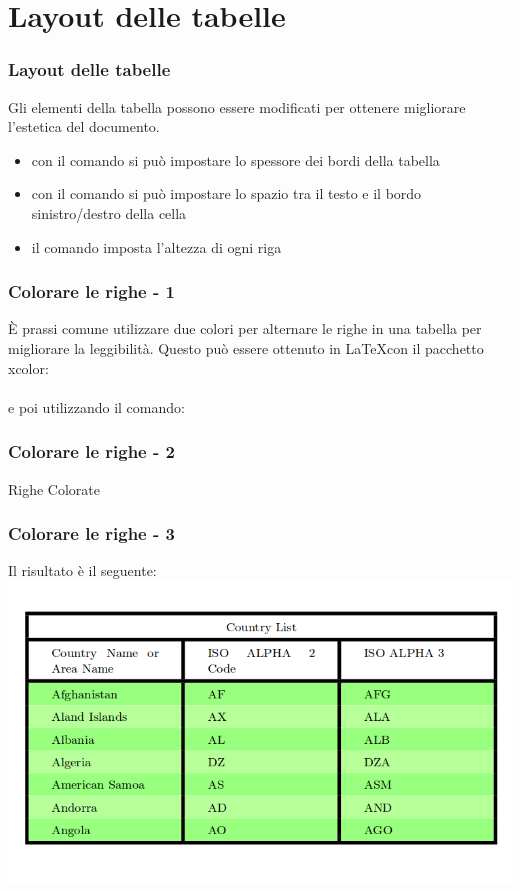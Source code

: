 \section{Layout delle tabelle}
\begin{frame}[fragile]
 \frametitle{Layout delle tabelle}

 Gli elementi della tabella possono essere modificati per ottenere migliorare l'estetica del documento.
 \begin{itemize}
     \item con il comando \inline{\setlength{\arrayrulewidth}{1mm}} si pu\`o impostare lo spessore dei bordi della tabella
     \item con il comando \inline{\setlength{\tabcolsep}{18pt}} si pu\`o impostare lo spazio tra il testo e il bordo sinistro/destro della cella
     \item il comando \inline{\renewcommand{\arraystretch}{1.5}} imposta l'altezza di ogni riga
 \end{itemize}
\end{frame}

\begin{frame}
 \frametitle{Colorare le righe - 1}
 È prassi comune utilizzare due colori per alternare le righe in una tabella per migliorare la leggibilità. Questo può essere ottenuto in \LaTeX con il pacchetto xcolor: \\ \inline{\usepackage[table]{xcolor}} \\
 e poi utilizzando il comando:\\
 \end{frame}
 
 \begin{frame}
 \frametitle{Colorare le righe - 2}
 \begin{esempio}{Righe Colorate}
 \end{esempio}
\end{frame}

\begin{frame}
 \frametitle{Colorare le righe - 3}
  Il risultato \`e il seguente:
   \centering
   \includegraphics[scale=0.4]{res/images/TablesColored}
\end{frame}